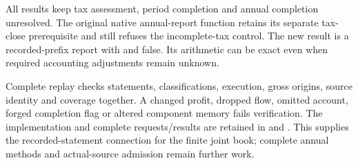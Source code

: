 All results keep tax assessment, period completion and annual completion
unresolved. The original native annual-report function retains its separate
tax-close prerequisite and still refuses the incomplete-tax control. The new
result is a recorded-prefix report with  and
 false. Its arithmetic can be exact even
when required accounting adjustments remain unknown.

Complete replay checks statements, classifications, execution, gross origins,
source identity and coverage together. A changed profit, dropped flow, omitted
account, forged completion flag or altered component memory fails verification.
The implementation and complete requests/results are retained in
 and
.
This supplies the recorded-statement connection for the finite joint book;
complete annual methods and actual-source admission remain further work.
